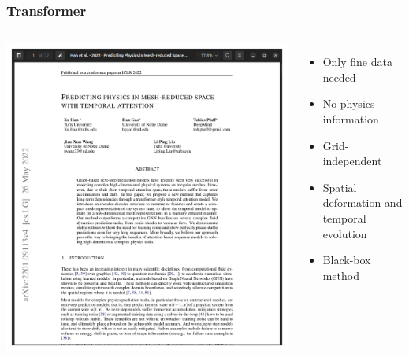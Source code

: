 \documentclass{beamer}
\begin{document}
\begin{frame}
    \frametitle{Transformer}
\begin{columns}
\includegraphics[scale=0.12]{figures/Transformer.png}
\begin{itemize}
    \item Only fine data needed
    \item No physics information
    \item Grid-independent
    \item Spatial deformation and temporal evolution
    \item Black-box method
\end{itemize}
\end{columns}
\end{frame}
\end{document}
